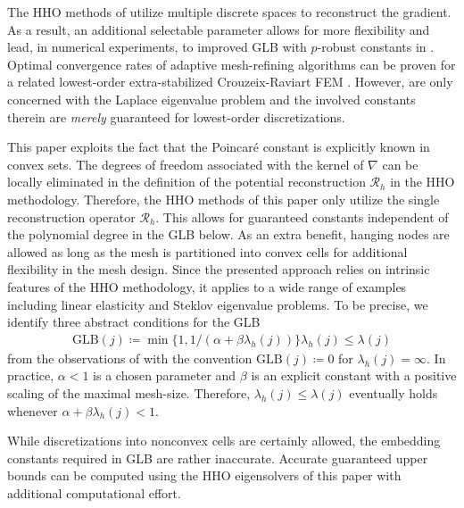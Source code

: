 \documentclass[a4paper]{amsart}
\numberwithin{equation}{section}
\theoremstyle{remark}
\theoremstyle{definition}
\theoremstyle{assumptionnoperiod}
\begin{document}
The HHO methods of \cite{CarstensenErnPuttkammer2021,CarstensenGraessleTran2024} utilize multiple discrete spaces to reconstruct the gradient. As a result, an additional selectable parameter allows for more flexibility and lead, in numerical experiments, to improved GLB \cite{CarstensenGraesslePirch2025} with $p$-robust constants in \cite{CarstensenGraessleTran2024}.
Optimal convergence rates of adaptive mesh-refining algorithms can be proven for a related lowest-order extra-stabilized Crouzeix-Raviart FEM \cite{CarstensenPuttkammer2024}.
However, \cite{CarstensenZhaiZhang2020,CarstensenErnPuttkammer2021,CarstensenGraessleTran2024} are only concerned with the Laplace eigenvalue problem and the involved constants therein are \emph{merely} guaranteed for lowest-order discretizations.

This paper exploits the fact that the Poincar\'e constant is explicitly known in convex sets. The degrees of freedom associated with the kernel of $\nabla$ can be locally eliminated in the definition of the potential reconstruction $\mathcal{R}_h$ in the HHO methodology.
Therefore, the HHO methods of this paper only utilize the single  reconstruction operator $\mathcal{R}_h$. This allows for guaranteed constants independent of the polynomial degree in the GLB below. 
As an extra benefit, hanging nodes are allowed as long as the mesh is partitioned into convex cells for additional flexibility in the mesh design.
Since the presented approach relies on intrinsic features of the HHO methodology, it applies to a wide range of examples including linear elasticity and Steklov eigenvalue problems.
To be precise, we identify
three abstract conditions for the GLB
\begin{align}\label{ineq:lower-bound}
	\mathrm{GLB}(j) \coloneqq \min\{1, 1/(\alpha + \beta \lambda_h(j))\}\lambda_h(j) \leq \lambda(j)
\end{align}
from the observations of \cite{CarstensenZhaiZhang2020}
with the convention $\mathrm{GLB}(j) \coloneqq 0$ for $\lambda_h(j) = \infty$.
In practice, $\alpha < 1$ is a chosen parameter and $\beta$ is an explicit constant with a positive scaling of the maximal mesh-size. Therefore, $\lambda_h(j) \leq \lambda(j)$ eventually holds whenever $\alpha + \beta \lambda_h(j) < 1$.

While discretizations into nonconvex cells are certainly allowed, the embedding constants required in GLB are rather inaccurate. Accurate guaranteed upper bounds can be computed using the HHO eigensolvers of this paper with additional computational effort.
\end{document}
